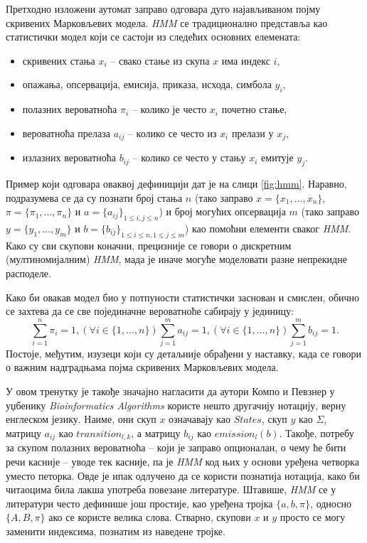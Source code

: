 \documentclass[12pt,oneside]{memoir}
\begin{document}
\begin{CJK}{UTF8}{ipxm}
Претходно изложени аутомат заправо одговара дуго најављиваном појму скривених Марковљевих модела. \textit{HMM} се традиционално представља као статистички модел који се састоји из следећих основних елемената:
\begin{itemize}
  \item скривених стања $x_i$ -- свако стање из скупа $x$ има индекс $i$,
  \item опажања, опсервација, емисија, приказа, исхода, симбола $y_i$,
  \item полазних вероватноћа $\pi_i$ -- колико је често $x_i$ почетно стање,
  \item вероватноћа прелаза $a_{ij}$ -- колико се често из $x_i$ прелази у $x_j$,
  \item излазних вероватноћа $b_{ij}$ -- колико се често у стању $x_i$ емитује $y_j$.
\end{itemize}
Пример који одговара оваквој дефиницији дат је на слици \ref{fig:hmm}. Наравно, подразумева се да су познати број стања $n$ (тако заправо $x = \{x_1, ..., x_n\}$, $\pi = \{\pi_1, ..., \pi_n\}$ и $a = \{a_{ij}\}_{1 \leq i, j \leq n}$) и број могућих опсервација $m$ (тако заправо $y = \{y_1, ..., y_m\}$ и $b = \{b_{ij}\}_{1 \leq i \leq n, 1 \leq j \leq m}$) као помоћни елементи сваког \textit{HMM}. Како су сви скупови коначни, прецизније се говори о дискретним (мултиномијалним) \textit{HMM}, мада је иначе могуће моделовати разне непрекидне расподеле\cite{jordan2004}.

Како би овакав модел био у потпуности статистички заснован и смислен, обично се захтева да се све појединачне вероватноће сабирају у јединицу: $$\sum_{i=1}^n \pi_i = 1, (\forall i \in \{1, ..., n\}) \sum_{j=1}^m a_{ij} = 1, (\forall i \in \{1, ..., n\}) \sum_{j=1}^m b_{ij} = 1.$$ Постоје, међутим, изузеци који су детаљније обрађени у наставку, када се говори о важним надградњама појма скривених Марковљевих модела.

У овом тренутку је такође значајно нагласити да аутори Компо и Певзнер у уџбенику \textit{Bioinformatics Algorithms} користе нешто другачију нотацију, верну енглеском језику. Наиме, они скуп $x$ означавају као $States$, скуп $y$ као $\Sigma$, матрицу $a_{ij}$ као $transition_{l, k}$, а матрицу $b_{ij}$ као $emission_l(b)$. Такође, потребу за скупом полазних вероватноћа -- који је заправо опционалан, о чему ће бити речи касније -- уводе тек касније, па је \textit{HMM} код њих у основи уређена четворка уместо петорка. Овде је ипак одлучено да се користи познатија нотација, како би читаоцима била лакша употреба повезане литературе. Штавише, \textit{HMM} се у литератури често дефинише још простије, као уређена тројка $\{a, b, \pi\}$, односно $\{A, B, \pi\}$ ако се користе велика слова. Стварно, скупови $x$ и $y$ просто се могу заменити индексима, познатим из наведене тројке.


\end{CJK}
\end{document}
